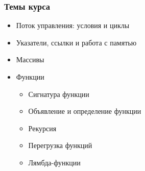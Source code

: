\documentclass[compress, aspectratio=169]{beamer}
\begin{document}
\begin{frame}

    \frametitle{Темы курса}

    \begin{itemize}

        \item Поток управления: условия и циклы

        \item Указатели, ссылки и работа с памятью

        \item Массивы

        \item Функции

            \begin{itemize}

                \item Сигнатура функции

                \item Объявление и определение функции

                \item Рекурсия

                \item Перегрузка функций

                \item Лямбда-функции

            \end{itemize}

    \end{itemize}

\end{frame}
\end{document}
